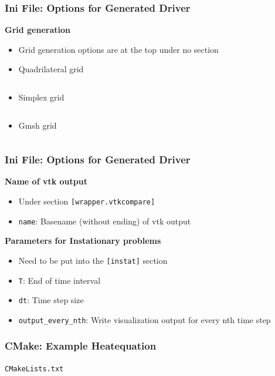 \documentclass[aspectratio=169,11pt]{beamer}
\theoremstyle{definition}
\begin{document}
\begin{frame}[fragile]
  \frametitle{Ini File: Options for Generated Driver}
  \textbf{Grid generation}


  \begin{itemize}
  \item Grid generation options are at the top under no section
  \item Quadrilateral grid
    \inputminted[fontsize=\tiny, firstline=1, lastline=2]{ini}{../src/heatequation.ini}
  \item Simplex grid
    \inputminted[fontsize=\tiny, firstline=1, lastline=4]{ini}{../src/poisson.ini}
  \item Gmsh grid
    \inputminted[fontsize=\tiny, firstline=1, lastline=1]{ini}{../exercise/task/navier_stokes.ini}

  \end{itemize}

\end{frame}

\begin{frame}[fragile]
  \frametitle{Ini File: Options for Generated Driver}
  \vfill
  \textbf{Name of vtk output}
  \begin{itemize}
  \item Under section \lstinline{[wrapper.vtkcompare]}
  \item \lstinline{name}: Basename (without ending) of vtk output
  \end{itemize}
  \vfill
  \textbf{Parameters for Instationary problems}
  \begin{itemize}
  \item Need to be put into the \lstinline{[instat]} section
  \item \lstinline{T}: End of time interval
  \item \lstinline{dt}: Time step size
  \item \lstinline{output_every_nth}: Write visualization output for every nth time
    step
  \end{itemize}
  \vfill
\end{frame}

\begin{frame}[fragile]
  \frametitle{CMake: Example Heatequation}

  
  \lstinline{CMakeLists.txt}
  \inputminted[fontsize=\tiny, firstline=3, lastline=9]{cmake}{../src/CMakeLists.txt}
\end{frame}
\end{document}
